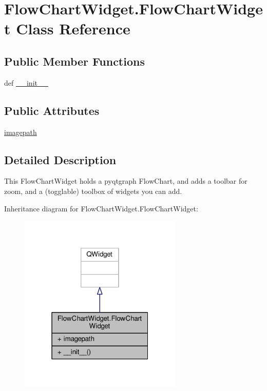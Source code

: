 \hypertarget{classFlowChartWidget_1_1FlowChartWidget}{}\section{Flow\+Chart\+Widget.\+Flow\+Chart\+Widget Class Reference}
\label{classFlowChartWidget_1_1FlowChartWidget}
\subsection*{Public Member Functions}
\begin{DoxyCompactItemize}
\item 
def \hyperlink{classFlowChartWidget_1_1FlowChartWidget_ad19de55f5900fbc68c169860999f6326}{\+\_\+\+\_\+init\+\_\+\+\_\+}
\end{DoxyCompactItemize}
\subsection*{Public Attributes}
\begin{DoxyCompactItemize}
\item 
\hyperlink{classFlowChartWidget_1_1FlowChartWidget_a66a1b98ec0242c5f6ed4148a806593dc}{imagepath}
\end{DoxyCompactItemize}


\subsection{Detailed Description}
\begin{DoxyVerb}This FlowChartWidget holds a pyqtgraph FlowChart, and adds a toolbar for zoom, and a (togglable) toolbox of widgets you can add.
\end{DoxyVerb}
 

Inheritance diagram for Flow\+Chart\+Widget.\+Flow\+Chart\+Widget\+:\nopagebreak
\begin{figure}[H]
\begin{center}
\leavevmode
\includegraphics[width=220pt]{d9/de6/classFlowChartWidget_1_1FlowChartWidget__inherit__graph}
\end{center}
\end{figure}


